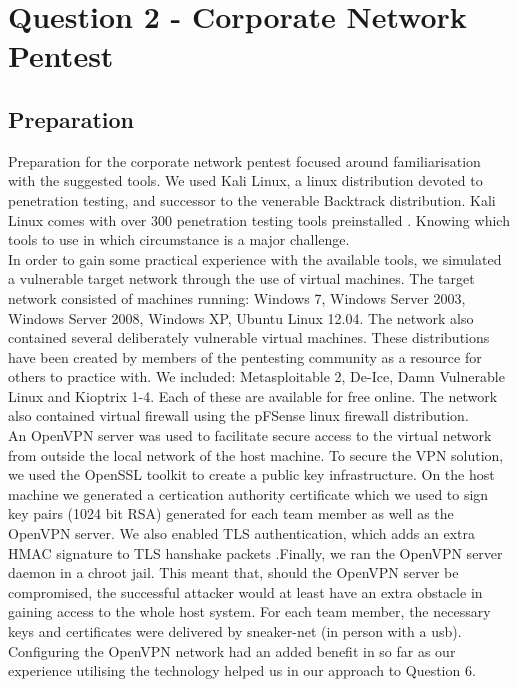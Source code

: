 \chapter{Question 2 - Corporate Network Pentest}

\section{Preparation}
Preparation for the corporate network pentest focused around familiarisation with the suggested tools. We used Kali Linux, a linux distribution devoted to penetration testing, and successor to the venerable Backtrack distribution. Kali Linux comes with over 300 penetration testing tools preinstalled \cite{kali} . Knowing which tools to use in which circumstance is a major challenge.\\
In order to gain some practical experience with the available tools, we simulated a vulnerable target network 
through the use of virtual machines. The target network consisted of machines running: Windows 7, Windows Server 2003, Windows Server 2008, Windows XP, Ubuntu Linux 12.04. The network also contained several deliberately vulnerable virtual machines. These distributions have been created by members of the pentesting community as a resource for others to practice with. We included: Metasploitable 2, De-Ice, Damn Vulnerable Linux and Kioptrix 1-4. Each of these are available for free online. The network also contained virtual firewall using the pFSense linux firewall distribution.\\
An OpenVPN server was used to facilitate secure access to the virtual network from outside the local network of the host machine. To secure the VPN solution, we used the OpenSSL toolkit to create a public key infrastructure. On the host machine we generated a certication authority certificate which we used to sign key pairs (1024 bit RSA) generated for each team member as well as the OpenVPN server. We also enabled TLS authentication, which adds an extra HMAC signature to TLS hanshake packets \cite{openvpn}.Finally, we ran the OpenVPN server daemon in a chroot jail. This meant that, should the OpenVPN server be compromised, the successful attacker would at least have an extra obstacle in gaining access to the whole host system. For each team member, the necessary keys and certificates were delivered by sneaker-net (in person with a usb). \\

Configuring the OpenVPN network had an added benefit in so far as our experience utilising the technology helped us in our approach to Question 6. 
